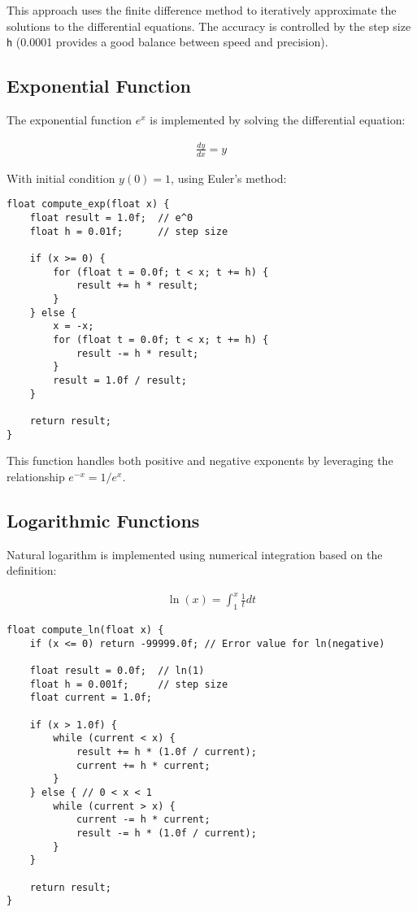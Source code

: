 \documentclass[12pt,a4paper]{article}
\begin{document}
This approach uses the finite difference method to iteratively approximate the solutions to the differential equations. The accuracy is controlled by the step size \texttt{h} (0.0001 provides a good balance between speed and precision).

\subsection{Exponential Function}

The exponential function $e^x$ is implemented by solving the differential equation:

\begin{align}
\frac{dy}{dx} = y
\end{align}

With initial condition $y(0) = 1$, using Euler's method:

\begin{lstlisting}
float compute_exp(float x) {
    float result = 1.0f;  // e^0
    float h = 0.01f;      // step size
    
    if (x >= 0) {
        for (float t = 0.0f; t < x; t += h) {
            result += h * result;
        }
    } else {
        x = -x;
        for (float t = 0.0f; t < x; t += h) {
            result -= h * result;
        }
        result = 1.0f / result;
    }
    
    return result;
}
\end{lstlisting}

This function handles both positive and negative exponents by leveraging the relationship $e^{-x} = 1/e^x$.

\subsection{Logarithmic Functions}

Natural logarithm is implemented using numerical integration based on the definition:

\begin{align}
\ln(x) = \int_{1}^{x} \frac{1}{t} dt
\end{align}

\begin{lstlisting}
float compute_ln(float x) {
    if (x <= 0) return -99999.0f; // Error value for ln(negative)
    
    float result = 0.0f;  // ln(1)
    float h = 0.001f;     // step size
    float current = 1.0f;
    
    if (x > 1.0f) {
        while (current < x) {
            result += h * (1.0f / current);
            current += h * current;
        }
    } else { // 0 < x < 1
        while (current > x) {
            current -= h * current;
            result -= h * (1.0f / current);
        }
    }
    
    return result;
}
\end{lstlisting}
\end{document}

